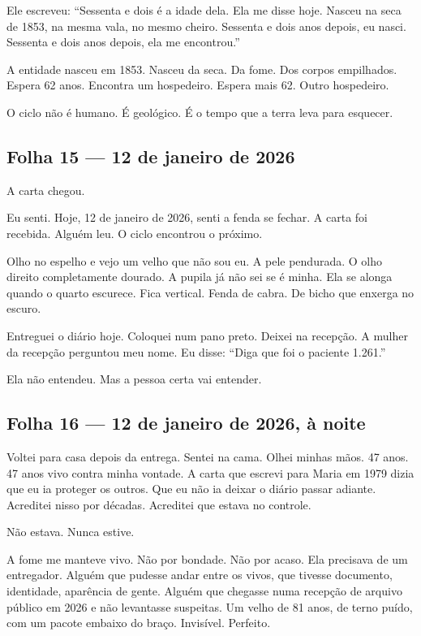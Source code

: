\noindent Ele escreveu: ``Sessenta e dois é a idade dela. Ela me disse hoje. Nasceu na seca de 1853, na mesma vala, no mesmo cheiro. Sessenta e dois anos depois, eu nasci. Sessenta e dois anos depois, ela me encontrou.''

\noindent A entidade nasceu em 1853. Nasceu da seca. Da fome. Dos corpos empilhados. Espera 62 anos. Encontra um hospedeiro. Espera mais 62. Outro hospedeiro.

\noindent O ciclo não é humano. É geológico. É o tempo que a terra leva para esquecer.

\subsection*{Folha 15 --- 12 de janeiro de 2026}

\noindent A carta chegou.

\noindent Eu senti. Hoje, 12 de janeiro de 2026, senti a fenda se fechar. A carta foi recebida. Alguém leu. O ciclo encontrou o próximo.

\noindent Olho no espelho e vejo um velho que não sou eu. A pele pendurada. O olho direito completamente dourado. A pupila já não sei se é minha. Ela se alonga quando o quarto escurece. Fica vertical. Fenda de cabra. De bicho que enxerga no escuro.

\noindent Entreguei o diário hoje. Coloquei num pano preto. Deixei na recepção. A mulher da recepção perguntou meu nome. Eu disse: ``Diga que foi o paciente 1.261.''

\noindent Ela não entendeu. Mas a pessoa certa vai entender.

\subsection*{Folha 16 --- 12 de janeiro de 2026, à noite}

\noindent Voltei para casa depois da entrega. Sentei na cama. Olhei minhas mãos. 47 anos. 47 anos vivo contra minha vontade. A carta que escrevi para Maria em 1979 dizia que eu ia proteger os outros. Que eu não ia deixar o diário passar adiante. Acreditei nisso por décadas. Acreditei que estava no controle.

\noindent Não estava. Nunca estive.

\noindent A fome me manteve vivo. Não por bondade. Não por acaso. Ela precisava de um entregador. Alguém que pudesse andar entre os vivos, que tivesse documento, identidade, aparência de gente. Alguém que chegasse numa recepção de arquivo público em 2026 e não levantasse suspeitas. Um velho de 81 anos, de terno puído, com um pacote embaixo do braço. Invisível. Perfeito.

